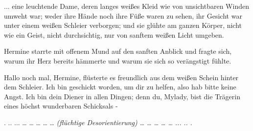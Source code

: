 ... eine leuchtende Dame, deren langes weißes Kleid wie von unsichtbaren Winden
umweht war; weder ihre Hände noch ihre Füße waren zu sehen, ihr Gesicht war
unter einem weißen Schleier verborgen; und sie glühte am ganzen Körper, nicht
wie ein Geist, nicht durchsichtig, nur von sanftem weißen Licht umgeben.

Hermine starrte mit offenem Mund auf den sanften Anblick und fragte sich, warum
ihr Herz bereits hämmerte und warum sie sich so verängstigt fühlte.

\glqq Hallo noch mal, Hermine\grqq{}, flüsterte es freundlich aus dem weißen
Schein hinter dem Schleier. \glqq Ich bin geschickt worden, um dir zu helfen,
also hab bitte keine Angst. Ich bin dein Diener in allen Dingen; denn du,
Mylady, bist die Trägerin eines höchst wunderbaren Schicksals -\grqq{}

. .. ... … … … … …
\emph{(flüchtige Desorientierung)}
\emph{… … …}
\emph{… …}
\emph{...}
\emph{..}
\emph{.}

